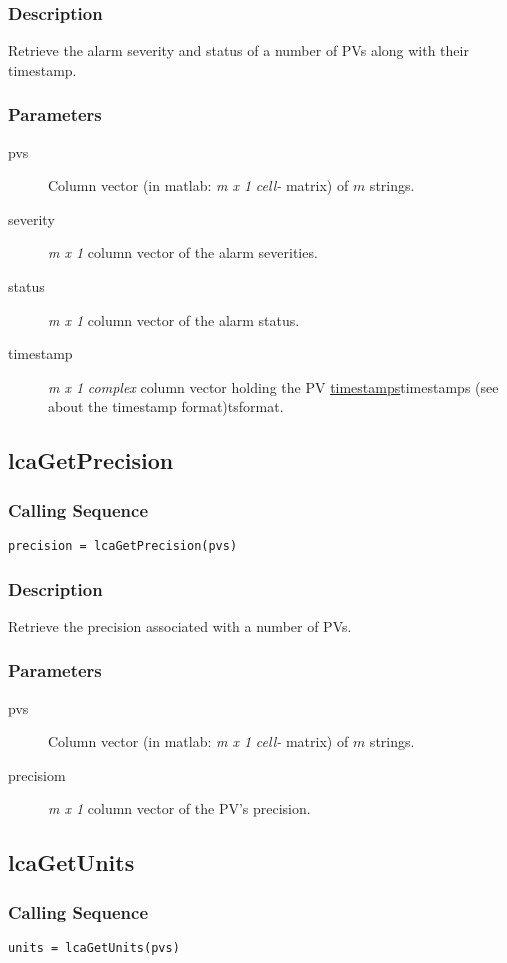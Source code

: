 \documentclass{article}
\newcommand{\pbrk}{\pagebreak[3]}
\newcommand{\ita}[1]{\emph{#1}}
\newcommand{\m}{$m$}
\newcommand{\mhack}{$m$} %
\newcommand{\mxl}{$m\times 1$}
\renewcommand{\m}{\ita{m}}
\newcommand{\mhack}{\ita{m}} %
\renewcommand{\mxl}{\ita{m x 1}}
\renewcommand{\pbrk}{}
\newcommand{\PVITEM}{
\item[pvs] Column vector (in matlab: \mxl{} \ita{cell-} matrix)
of \mhack{} strings.
}
\begin{document}
\subsubsection{Description}
Retrieve the alarm severity and status of a number of PVs along
with their timestamp.
\subsubsection{Parameters}
\begin{description}
\PVITEM
\item[severity] \mxl{} column vector of the alarm severities.
\item[status] \mxl{} column vector of the alarm status.
\item[timestamp] \mxl{} \ita{complex} column vector holding the
PV \hyperref[ref]{timestamps}{timestamps (see }{ about the timestamp format)}{tsformat}.
\end{description}


\vspace*{\fill}
\pbrk
\subsection{lcaGetPrecision}
\subsubsection{Calling Sequence}
\begin{verbatim}
precision = lcaGetPrecision(pvs)
\end{verbatim}
\subsubsection{Description}
Retrieve the precision associated with a number of PVs.
\subsubsection{Parameters}
\begin{description}
\PVITEM
\item[precisiom] \mxl{} column vector of the PV's precision.
\end{description}

\vspace*{\fill}
\pbrk
\subsection{lcaGetUnits}
\subsubsection{Calling Sequence}
\begin{verbatim}
units = lcaGetUnits(pvs)
\end{verbatim}
\end{document}
